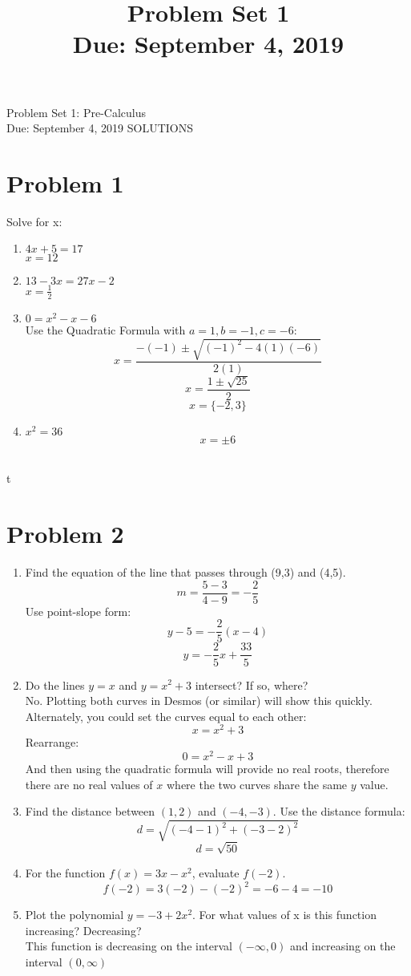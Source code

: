 \documentclass[11pt]{article}
\title{Problem Set 1\\ Due: September 4, 2019}%
\theoremstyle{definition}
\theoremstyle{remark}
\begin{document}
\begin{center}
{\huge Problem Set 1: Pre-Calculus}\\[5pt]
Due: September 4, 2019
{\Large SOLUTIONS}
\end{center}

\section*{Problem 1}
Solve for x:
\begin{enumerate}
\item $4x + 5 = 17$ \\
{\color{red} $x=12$}

\item $13 - 3x = 27x - 2$\\
{\color{red} $x = \frac{1}{2}$}
\item $0 = x^2 - x - 6$\\
{\color{red} Use the Quadratic Formula with $a=1, b=-1, c=-6$:
$$ x = \frac{-(-1) \pm \sqrt{(-1)^2 - 4(1)(-6)}}{2(1)}$$
$$ x = \frac{1 \pm \sqrt{25}}{2}$$
$$ x = \{-2,3\}$$}

\item $x^2 = 36$
{\color{red} $$ x = \pm 6$$}
\\[5pt]
\end{enumerate}t

\section*{Problem 2}
\begin{enumerate}
\item Find the equation of the line that passes through (9,3) and (4,5).
{\color{red} $$ m= \frac{5-3}{4-9} = -\frac{2}{5}$$
Use point-slope form:
$$ y - 5 = -\frac{2}{5}(x-4)$$
$$ y = -\frac{2}{5}x + \frac{33}{5}$$}
\item Do the lines $y=x$ and $y=x^2+3$ intersect?  If so, where? \\
{\color{red} No. Plotting both curves in Desmos (or similar) will show this quickly. Alternately, you could set the curves equal to each other:
$$ x = x^2 +3 $$
Rearrange:
$$ 0 = x^2 -x +3 $$
And then using the quadratic formula will provide no real roots, therefore there are no real values of $x$ where the two curves share the same $y$ value.}
\item Find the distance between $(1,2)$ and $(-4,-3)$.
{\color{red} Use the distance formula:
$$ d = \sqrt{(-4-1)^2 + (-3-2)^2}$$
$$ d = \sqrt{50}$$}

\item For the function $f(x) = 3x - x^2$, evaluate $f(-2)$.
{\color{red} $$f(-2) = 3(-2) - (-2)^2 = -6-4 = -10$$}

\item Plot the polynomial $y = -3 + 2x^2$. For what values of x is this function increasing? Decreasing?\\[5pt]
{\color{red} This function is decreasing on the interval $(-\infty, 0)$ and increasing on the interval $(0,\infty)$}
\end{enumerate}
\end{document}
